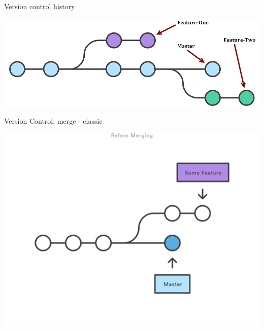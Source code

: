 \begin{frame}[fragile]{Version control history}

\begin{center}
\includegraphics[width=\textwidth]{vcs-history}
\end{center}

\end{frame}


%
%
%
%
%
%


\begin{frame}[fragile]{Version Control: merge - classic}

\begin{center}
\includegraphics[width=\textwidth]{git-merge-nff}
\end{center}

\end{frame}

